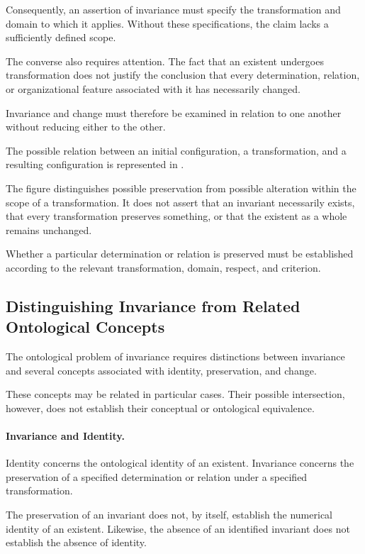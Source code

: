 Consequently, an assertion of invariance must specify
the transformation and domain to which it applies.
Without these specifications, the claim lacks a
sufficiently defined scope.

The converse also requires attention. The fact that
an existent undergoes transformation does not justify
the conclusion that every determination, relation,
or organizational feature associated with it has
necessarily changed.

Invariance and change must therefore be examined
in relation to one another without reducing either
to the other.

The possible relation between an initial configuration,
a transformation, and a resulting configuration is
represented in .



The figure distinguishes possible preservation from
possible alteration within the scope of a transformation.
It does not assert that an invariant necessarily exists,
that every transformation preserves something, or that
the existent as a whole remains unchanged.

Whether a particular determination or relation is
preserved must be established according to the relevant
transformation, domain, respect, and criterion.

\subsection{Distinguishing Invariance from Related Ontological Concepts}

The ontological problem of invariance requires distinctions
between invariance and several concepts associated with
identity, preservation, and change.

These concepts may be related in particular cases.
Their possible intersection, however, does not establish
their conceptual or ontological equivalence.

\paragraph{Invariance and Identity.}

Identity concerns the ontological identity of an existent.
Invariance concerns the preservation of a specified
determination or relation under a specified transformation.

The preservation of an invariant does not, by itself,
establish the numerical identity of an existent.
Likewise, the absence of an identified invariant does
not establish the absence of identity.

